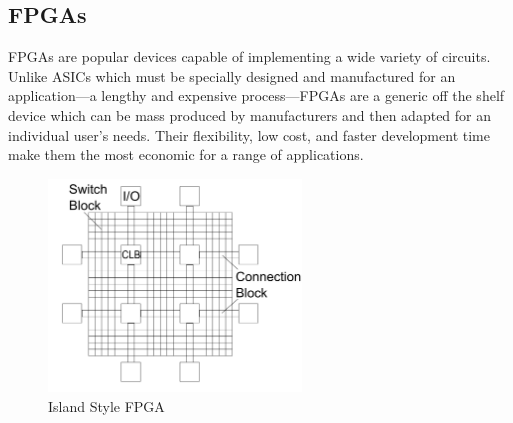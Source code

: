 \documentclass[12pt,final,oneside]{dwThesis} %
\begin{document}
   \subsection{\glspl{FPGA}}
   \glspl{FPGA} are popular devices capable of implementing a wide variety of circuits. Unlike \glspl{ASIC} which must be specially designed and manufactured for an application---a lengthy and expensive process---\glspl{FPGA} are a generic off the shelf device which can be mass produced by manufacturers and then adapted for an individual user's needs. Their flexibility, low cost, and faster development time make them the most economic for a range of applications.


   \begin{figure}
      \begin{center}
         \includegraphics[width=0.6\textwidth]{images/ArchFull.pdf}
         \caption{Island Style FPGA}
         \label{FPGAArch}
      \end{center}
   \end{figure}
\end{document}
